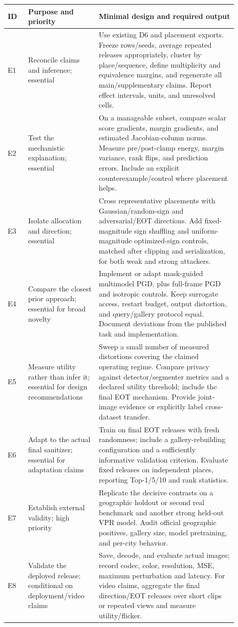 \documentclass[11pt,a4paper]{article}
\begin{document}
\begin{longtable}{L{0.08\linewidth}L{0.27\linewidth}L{0.54\linewidth}}
\toprule
ID & Purpose and priority & Minimal design and required output \\
\midrule
\endhead
E1 & Reconcile claims and inference; essential & Use existing D6 and placement exports. Freeze rows/seeds, average repeated releases appropriately, cluster by place/sequence, define multiplicity and equivalence margins, and regenerate all main/supplementary claims. Report effect intervals, units, and unresolved cells. \\
E2 & Test the mechanistic explanation; essential & On a manageable subset, compare scalar score gradients, margin gradients, and estimated Jacobian-column norms. Measure pre/post-clamp energy, margin variance, rank flips, and prediction errors. Include an explicit counterexample/control where placement helps. \\
E3 & Isolate allocation and direction; essential & Cross representative placements with Gaussian/random-sign and adversarial/EOT directions. Add fixed-magnitude sign shuffling and uniform-magnitude optimized-sign controls, matched after clipping and serialization, for both weak and strong attackers. \\
E4 & Compare the closest prior approach; essential for broad novelty & Implement or adapt mask-guided multimodel PGD, plus full-frame PGD and isotropic controls. Keep surrogate access, restart budget, output distortion, and query/gallery protocol equal. Document deviations from the published task and implementation. \\
E5 & Measure utility rather than infer it; essential for design recommendations & Sweep a small number of measured distortions covering the claimed operating regime. Compare privacy against detector/segmenter metrics and a declared utility threshold; include the final EOT mechanism. Provide joint-image evidence or explicitly label cross-dataset transfer. \\
E6 & Adapt to the actual final sanitizer; essential for adaptation claims & Train on final EOT releases with fresh randomness; include a gallery-rebuilding configuration and a sufficiently informative validation criterion. Evaluate fixed releases on independent places, reporting Top-1/5/10 and rank statistics. \\
E7 & Establish external validity; high priority & Replicate the decisive contrasts on a geographic holdout or second real benchmark and another strong held-out VPR model. Audit official geographic positives, gallery size, model pretraining, and per-city behavior. \\
E8 & Validate the deployed release; conditional on deployment/video claims & Save, decode, and evaluate actual images; record codec, color, resolution, MSE, maximum perturbation and latency. For video claims, aggregate the final direction/EOT releases over short clips or repeated views and measure utility/flicker. \\
\bottomrule
\end{longtable}
\end{document}
